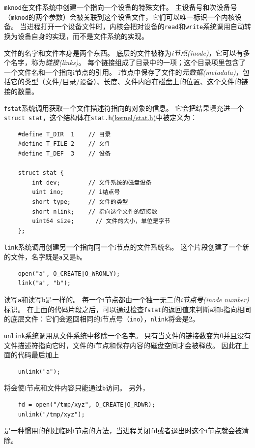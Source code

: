 \texttt{mknod}在文件系统中创建一个指向一个设备的特殊文件。
主设备号和次设备号（\texttt{mknod}的两个参数）会被关联到这个设备文件，它们可以唯一标识一个内核设备。
当进程打开一个设备文件时，内核会把对设备的\texttt{read}和\texttt{write}系统调用自动转换为设备自身的实现，而不是文件系统的实现。

文件的名字和文件本身是两个东西。
底层的文件被称为\emph{i节点(inode)}，它可以有多个名字，称为\emph{链接(links)}。
每个链接组成了目录中的一项；这个目录项里包含了一个文件名和一个指向i节点的引用。
i节点中保存了文件的\emph{元数据(metadata)}，包括它的类型（文件/目录/设备）、长度、文件内容在磁盘上的位置、这个文件的链接的数量。

\texttt{fstat}系统调用获取一个文件描述符指向的对象的信息。
它会把结果填充进一个\texttt{struct stat}，这个结构体在\texttt{stat.h}\href{https://github.com/mit-pdos/xv6-riscv/blob/riscv//kernel/stat.h}{(kernel/stat.h)}中被定义为：
\begin{lstlisting}
    #define T_DIR  1    // 目录
    #define T_FILE 2    // 文件
    #define T_DEF  3    // 设备

    struct stat {
        int dev;        // 文件系统的磁盘设备
        uint ino;       // i结点号
        short type;     // 文件的类型
        short nlink;    // 指向这个文件的链接数
        uint64 size;      // 文件的大小，单位是字节
    };
\end{lstlisting}

\texttt{link}系统调用创建另一个指向同一个i节点的文件系统名。
这个片段创建了一个新的文件，名字既是\texttt{a}又是\texttt{b}。

\begin{lstlisting}
    open("a", O_CREATE|O_WRONLY);
    link("a", "b");
\end{lstlisting}

读写\texttt{a}和读写\texttt{b}是一样的。
每一个i节点都由一个独一无二的\emph{i节点号(inode number)}标识。
在上面的代码片段之后，可以通过检查\texttt{fstat}的返回值来判断\texttt{a}和\texttt{b}指向相同的底层文件：它们会返回相同的i节点号（\texttt{ino}），\texttt{nlink}将会是2。

\texttt{unlink}系统调用从文件系统中移除一个名字。
只有当文件的链接数变为0并且没有文件描述符指向它时，文件的i节点和保存内容的磁盘空间才会被释放。
因此在上面的代码最后加上
\begin{lstlisting}
    unlink("a");
\end{lstlisting}
将会使i节点和文件内容只能通过\texttt{b}访问。
另外，
\begin{lstlisting}
    fd = open("/tmp/xyz", O_CREATE|O_RDWR);
    unlink("/tmp/xyz");
\end{lstlisting}
是一种惯用的创建临时i节点的方法，当进程关闭\texttt{fd}或者退出时这个i节点就会被清除。

